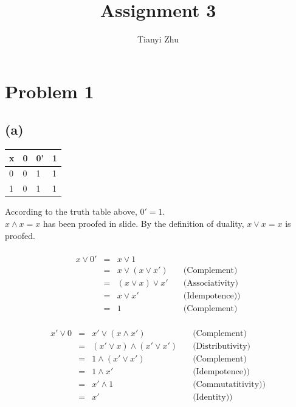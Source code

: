 \documentclass{article} %
\begin{document}
\title{Assignment 3}
\author{Tianyi Zhu} %
\maketitle %

\section*{Problem 1} %
\subsection*{(a)}
\begin{table}[htbp]
        \begin{tabular}{|l|l|l|l|}
        \hline
        x & 0 & 0' & 1 \\ \hline
        0 & 0 & 1  & 1 \\ \hline
        1 & 0 & 1  & 1 \\ \hline
        \end{tabular}
\end{table}
According to the truth table above, $0' = 1$.\\
$x \wedge x = x$ has been proofed in slide. By the definition of duality, $x \vee x = x$ is proofed.\\
\\
\[\begin{array}{rllr}
    x \vee 0'    &=& x \vee 1 \\
                    &=& x \vee (x \vee x')    &\quad\mbox{(Complement)}\\
                    &=& (x \vee x) \vee x'    &\quad\mbox{(Associativity)}\\
                    &=& x \vee x'    &\quad\mbox{(Idempotence))}\\
                    &=& 1   &\quad\mbox{(Complement)}
\end{array}\]
\\
\[\begin{array}{rllr}
    x' \vee 0    &=& x' \vee (x \wedge x') &\quad\mbox{(Complement)}\\
                    &=& (x' \vee x) \wedge (x' \vee x') &\quad\mbox{(Distributivity)}\\
                    &=& 1 \wedge (x' \vee x') &\quad\mbox{(Complement)}\\
                    &=& 1 \wedge x'  &\quad\mbox{(Idempotence))}\\
                    &=& x' \wedge 1  &\quad\mbox{(Commutatitivity))}\\
                    &=& x'              &\quad\mbox{(Identity))}\\
\end{array}\]
\end{document}
